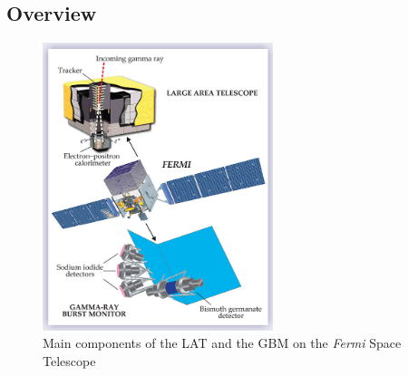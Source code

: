 \subsection{Overview}

\begin{figure}[h!]
    \centering
    \includegraphics[width=0.6\textwidth]{content/background/figures/fermi_instrument.jpeg}
    \caption{
        Main components of the LAT and the GBM on the \textit{Fermi}
        Space Telescope \citep{fermi_lat_instrument_first_year}}
    \label{fig:fermi_main_components}
\end{figure}

